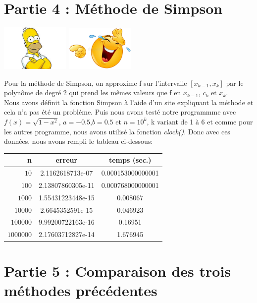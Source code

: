 \documentclass{article}
\begin{document}
\section{Partie 4 : Méthode de Simpson}
\begin{center}
\includegraphics[width=0.25\textwidth]{doc1.jpeg}
\includegraphics[width=0.25\textwidth]{rir.jpg}
\end{center}
Pour la méthode de Simpson, on approxime f sur l'intervalle $[x_{k-1}, x_k]$ par le polynôme de degré 2 qui prend les mêmes valeurs que f en $x_{k-1}$, $c_k$ et $x_k$.\\
Nous avons définit la fonction Simpson à l'aide d'un site expliquant la méthode et cela n'a pas été un probléme. Puis nous avons testé notre programmme avec $f(x)= \sqrt{1 - x^2}$, $a=-0.5 $,$b=0.5$ et $ n=10^{k}$, k variant de 1 à 6 et comme pour les autres programme, nous avons utilisé la fonction \textit{clock()}. Donc avec ces données, nous avons rempli le tableau ci-dessous: \\

\begin{center}
\begin{tabular}{r | c | c}
{n} & erreur & temps (sec.)\\
\hline
$10$ & {2.1162618713e-07} & {0.000153000000001}\\
$100$ & {2.13807860305e-11 } & {0.000768000000001}\\
$1000$ & {1.55431223448e-15} & {0.008067}\\
$10000$ & {2.6645352591e-15} & {0.046923}\\
$100000$ & {9.99200722163e-16} & {0.16951}\\
$1000000$ & {2.17603712827e-14} & {1.676945}
\end{tabular}
\end{center}

\section{Partie 5 : Comparaison des trois méthodes précédentes }
\end{document}
